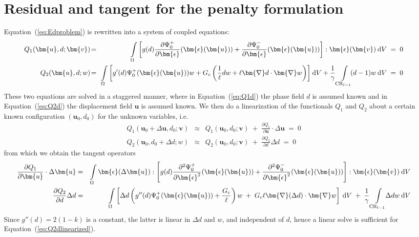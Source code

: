 \documentclass{article}
\def\deriv#1#2{\frac{\partial#1}{\partial#2}}
\def\dderiv#1#2{\frac{\partial^2#1}{\partial#2^2}}
\def\dV{\:{\rm d}V}
\begin{document}
\section{Residual and tangent for the penalty formulation}

Equation~(\ref{eq:Edproblem}) is rewritten into a system of coupled equations:
%
\begin{eqnarray}
  \label{eq:Q1d}
  Q_1(\bm{u},d;\bm{v})\! &=& \!\!\int\limits_\Omega \left[
    g(d)\deriv{\Psi_0^+}{\bm{\epsilon}}(\bm{\epsilon}(\bm{u})) +
        \deriv{\Psi_0^-}{\bm{\epsilon}}(\bm{\epsilon}(\bm{u}))
        \right] : \bm{\epsilon}(\bm{v})\dV \;=\; 0 \\
  \label{eq:Q2d}
  Q_2(\bm{u},d;w)\! &=& \!\!\int\limits_\Omega \left[
    g'(d)\Psi_0^+(\bm{\epsilon}(\bm{u}))w + G_c\left(
    \frac{1}{\ell}dw + \ell\bm{\nabla}d\cdot\bm{\nabla}w
    \right)\right]\!\dV + \frac{1}{\gamma}\int\limits_{{\rm CR}_{l-1}}\!\!(d-1)w \dV
  \;=\; 0
\end{eqnarray}
%
These two equations are solved in a staggered manner,
where in Equation~(\ref{eq:Q1d}) the phase field $d$ is assumed known and in
Equation~(\ref{eq:Q2d}) the displacement field $\bm{u}$ is assumed known.
We then do a linearization of the functionals $Q_1$ and $Q_2$ about a certain
known configuration $(\bm{u}_0,d_0)$ for the unknown variables, i.e.
%
\begin{eqnarray}
  \label{eq:Q1dlinearized}
  Q_1(\bm{u}_0+\Delta\bm{u},d_0;\bm{v}) &\approx&
  Q_1(\bm{u}_0,d_0;\bm{v}) \;+\; \deriv{Q_1}{\bm{u}}\cdot\Delta\bm{u} \;=\; 0 \\
  \label{eq:Q2dlinearized}
  Q_2(\bm{u}_0,d_0+\Delta d;w) &\approx&
  Q_2(\bm{u}_0,d_0;\bm{v}) \;+\; \deriv{Q_2}{d}\Delta d\;=\; 0
\end{eqnarray}
%
from which we obtain the tangent operators
%
\begin{eqnarray}
  \label{eq:Q1dtangent}
  \deriv{Q_1}{\bm{u}}\cdot\Delta\bm{u} &=&
  \int\limits_\Omega \bm{\epsilon}(\Delta\bm{u}) : \left[
    g(d)\dderiv{\Psi_0^+}{\bm{\epsilon}}(\bm{\epsilon}(\bm{u})) +
        \dderiv{\Psi_0^-}{\bm{\epsilon}}(\bm{\epsilon}(\bm{u}))
    \right] : \bm{\epsilon}(\bm{v})\dV \\
  \label{eq:Q2dtangent}
  \deriv{Q_2}{d}\Delta d &=&
  \int\limits_\Omega \left[ \Delta d \left(
    g''(d)\Psi_0^+(\bm{\epsilon}(\bm{u})) + \frac{G_c}{\ell} \right) w \;+\;
    G_c\ell\bm{\nabla}(\Delta d)\cdot\bm{\nabla}w \right] \dV \;+\;
    \frac{1}{\gamma}\int\limits_{{\rm CR}_{l-1}}\!\!\Delta dw \dV
\end{eqnarray}
%
Since $g''(d)=2(1-k)$ is a constant, the latter is linear in $\Delta d$ and $w$,
and independent of $d$, hence a linear solve is sufficient for
Equation~(\ref{eq:Q2dlinearized}).



\end{document}

